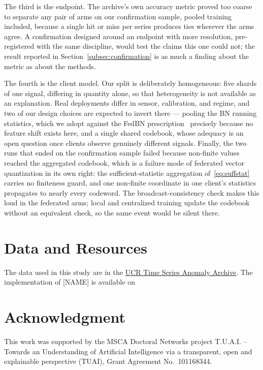 \documentclass[conference]{IEEEtran}
\begin{document}
The third is the endpoint. The archive's own accuracy metric proved too coarse to separate any pair
of arms on our confirmation sample, pooled training included, because a single hit or miss per
series produces ties wherever the arms agree. A confirmation designed around an endpoint with more
resolution, pre-registered with the same discipline, would test the claims this one could not; the
result reported in Section~\ref{subsec:confirmation} is as much a finding about the metric as about
the methods.

The fourth is the client model. Our split is deliberately homogeneous: five shards of one signal,
differing in quantity alone, so that heterogeneity is not available as an explanation. Real
deployments differ in sensor, calibration, and regime, and two of our design choices are expected to
invert there --- pooling the BN running statistics, which we adopt against the FedBN
prescription~\cite{li2021fedbn} precisely because no feature shift exists here, and a single shared
codebook, whose adequacy is an open question once clients observe genuinely different signals.
Finally, the two runs that ended on the confirmation sample failed because non-finite values reached
the aggregated codebook, which is a failure mode of federated vector quantization in its own right:
the sufficient-statistic aggregation of~\eqref{eq:suffstat} carries no finiteness guard, and one
non-finite coordinate in one client's statistics propagates to nearly every codeword. The
broadcast-consistency check makes this loud in the federated arms; local and centralized training
update the codebook without an equivalent check, so the same event would be silent there.

\section*{Data and Resources}
The data used in this study are in the \href{https://www.cs.ucr.edu/\%7Eeamonn/time_series_data_2018/UCR_TimeSeriesAnomalyDatasets2021.zip}{UCR Time Series Anomaly Archive}. The implementation of [NAME] is available on %

\section*{Acknowledgment}

This work was supported by the MSCA Doctoral Networks project T.U.A.I. -- Towards an Understanding of Artificial Intelligence via a transparent, open and explainable perspective (TUAI), Grant Agreement No.~101168344.



\end{document}

